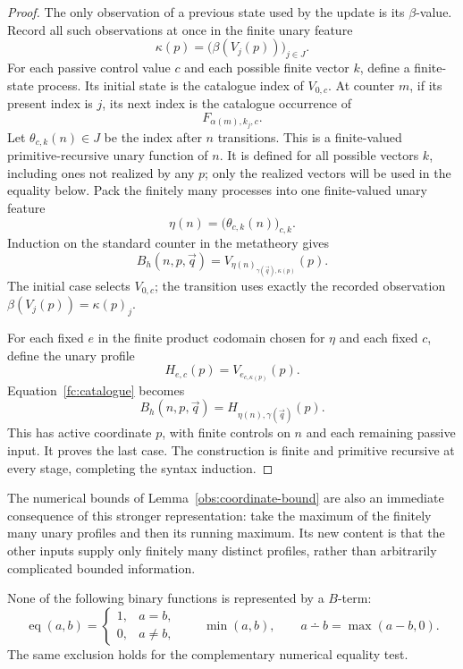 \begin{proof}
The only observation of a previous state used by the update is its
$\beta$-value. Record all such observations at once in the finite unary
feature
\[
                         \kappa(p)=\bigl(\beta(V_j(p))\bigr)_{j\in J}.
\]
For each passive control value $c$ and each possible finite vector $k$,
define a finite-state process. Its initial state is the catalogue index
of $V_{0,c}$. At counter $m$, if its present index is $j$, its next index
is the catalogue occurrence of
\[
                              F_{\alpha(m),k_j,c}.
\]
Let $\theta_{c,k}(n)\in J$ be the index after $n$ transitions. This is
a finite-valued primitive-recursive unary function of $n$. It is
defined for all possible vectors $k$, including ones not realized by
any $p$; only the realized vectors will be used in the equality below.
Pack the finitely many processes into one finite-valued unary feature
\[
                              \eta(n)=\bigl(\theta_{c,k}(n)\bigr)_{c,k}.
\]
Induction on the standard counter in the metatheory gives
\[
 B_h(n,p,\vec q)
   =V_{\eta(n)_{\gamma(\vec q),\kappa(p)}}(p).
 \tag{Catalogue evaluation}\label{fc:catalogue}
\]
The initial case selects $V_{0,c}$; the transition uses exactly the
recorded observation $\beta(V_j(p))=\kappa(p)_j$.

For each fixed $e$ in the finite product codomain chosen for $\eta$
and each fixed $c$,
define the unary profile
\[
                              H_{e,c}(p)=V_{e_{c,\kappa(p)}}(p).
\]
Equation~\eqref{fc:catalogue} becomes
\[
                       B_h(n,p,\vec q)=H_{\eta(n),\gamma(\vec q)}(p).
\]
This has active coordinate $p$, with finite controls on $n$ and each
remaining passive input. It proves the last case. The construction is
finite and primitive recursive at every stage, completing the syntax
induction.
\end{proof}

The numerical bounds of Lemma~\ref{obs:coordinate-bound} are also an
immediate consequence of this stronger representation: take the maximum
of the finitely many unary profiles and then its running maximum. Its
new content is that the other inputs supply only finitely many distinct
profiles, rather than arbitrarily complicated bounded information.

\begin{corollary}
\label{fc:excluded}
None of the following binary functions is represented by a $B$-term:
\[
 \operatorname{eq}(a,b)=
 \begin{cases}1,&a=b,\\0,&a\ne b,\end{cases}
 \qquad
 \min(a,b),
 \qquad
 a\mathbin{\dotminus}b=\max(a-b,0).
\]
The same exclusion holds for the complementary numerical equality test.
\end{corollary}

